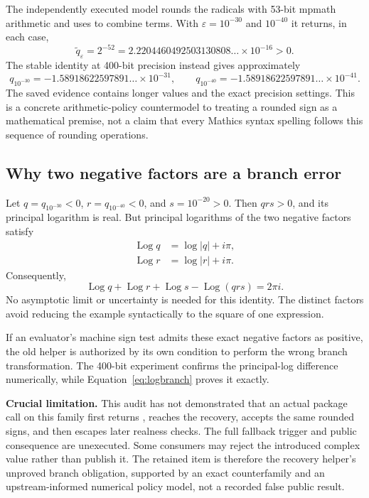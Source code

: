 \documentclass[11pt,letterpaper]{article}
\newcommand{\code}[1]{\texttt{\detokenize{#1}}}
\DeclareMathOperator{\Log}{Log}
\begin{document}
The independently executed model rounds the radicals with 53-bit mpmath arithmetic and uses \code{fsum} to combine terms. With $\varepsilon=10^{-30}$ and $10^{-40}$ it returns, in each case,
\[
 \widetilde q_\varepsilon=2^{-52}
 =2.2204460492503130808\ldots\times10^{-16}>0.
\]
The stable identity at 400-bit precision instead gives approximately
\[
 q_{10^{-30}}=-1.58918622597891\ldots\times10^{-31},\qquad
 q_{10^{-40}}=-1.58918622597891\ldots\times10^{-41}.
\]
The saved evidence contains longer values and the exact precision settings. This is a concrete arithmetic-policy countermodel to treating a rounded sign as a mathematical premise, not a claim that every Mathics syntax spelling follows this sequence of rounding operations.

\subsection{Why two negative factors are a branch error}

Let $q=q_{10^{-30}}<0$, $r=q_{10^{-40}}<0$, and $s=10^{-20}>0$. Then $qrs>0$, and its principal logarithm is real. But principal logarithms of the two negative factors satisfy
\begin{align*}
 \Log q&=\log|q|+i\pi,\\
 \Log r&=\log|r|+i\pi.
\end{align*}
Consequently,
\begin{equation}
 \Log q+\Log r+\Log s-\Log(qrs)=2\pi i.
 \label{eq:logbranch}
\end{equation}
No asymptotic limit or uncertainty is needed for this identity. The distinct factors avoid reducing the example syntactically to the square of one expression.

If an evaluator's machine sign test admits these exact negative factors as positive, the old helper is authorized by its own condition to perform the wrong branch transformation. The 400-bit experiment confirms the principal-log difference numerically, while Equation~\eqref{eq:logbranch} proves it exactly.

\textbf{Crucial limitation.} This audit has not demonstrated that an actual package call on this family first returns \code{Indeterminate}, reaches the recovery, accepts the same rounded signs, and then escapes later realness checks. The full fallback trigger and public consequence are unexecuted. Some consumers may reject the introduced complex value rather than publish it. The retained item is therefore the recovery helper's unproved branch obligation, supported by an exact counterfamily and an upstream-informed numerical policy model, not a recorded false public result.
\end{document}
